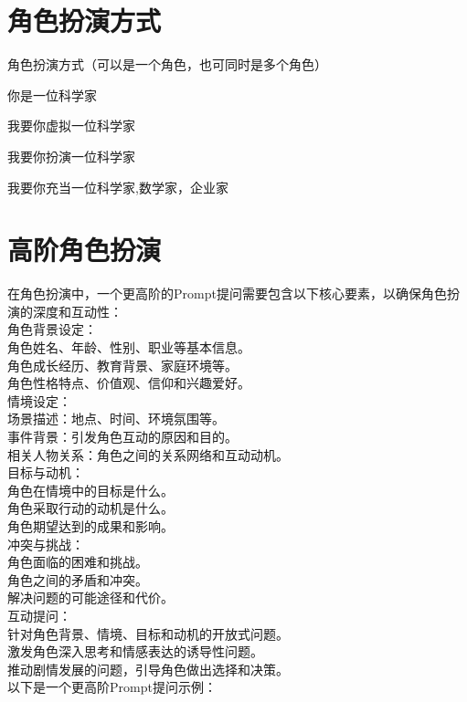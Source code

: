 \documentclass[12pt]{book}
\begin{document}
\section{角色扮演方式}

角色扮演方式（可以是一个角色，也可同时是多个角色）

	\begin{tcolorbox}
		你是一位科学家
	\end{tcolorbox}
	
	\begin{tcolorbox}
		我要你虚拟一位科学家
	\end{tcolorbox}
	
	\begin{tcolorbox}
	我要你扮演一位科学家
	\end{tcolorbox}	
	
	\begin{tcolorbox}
		我要你充当一位科学家,数学家，企业家
	\end{tcolorbox}	
	
	
\section{高阶角色扮演}
在角色扮演中，一个更高阶的Prompt提问需要包含以下核心要素，以确保角色扮演的深度和互动性：\\

角色背景设定：\\
角色姓名、年龄、性别、职业等基本信息。\\
角色成长经历、教育背景、家庭环境等。\\
角色性格特点、价值观、信仰和兴趣爱好。\\
情境设定：\\
场景描述：地点、时间、环境氛围等。\\
事件背景：引发角色互动的原因和目的。\\
相关人物关系：角色之间的关系网络和互动动机。\\
目标与动机：\\
角色在情境中的目标是什么。\\
角色采取行动的动机是什么。\\
角色期望达到的成果和影响。\\
冲突与挑战：\\
角色面临的困难和挑战。\\
角色之间的矛盾和冲突。\\
解决问题的可能途径和代价。\\
互动提问：\\
针对角色背景、情境、目标和动机的开放式问题。\\
激发角色深入思考和情感表达的诱导性问题。\\
推动剧情发展的问题，引导角色做出选择和决策。\\
以下是一个更高阶Prompt提问示例：\\
\end{document}
